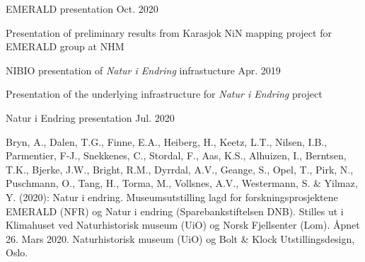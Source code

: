 
\begin{cventries}
    \cventry
  {} %
  {EMERALD presentation} %
  {} %
  {Oct. 2020} %
  {
    \begin{cvitems} %
      \item {Presentation of preliminary results from Karasjok NiN mapping project for EMERALD group at NHM}
    \end{cvitems}
  }
  \cventry
    {} %
    {NIBIO presentation of \textit{Natur i Endring} infrastucture} %
    {} %
    {Apr. 2019} %
    {
      \begin{cvitems} %
        \item {Presentation of the underlying infrastructure for \textit{Natur i Endring} project}
      \end{cvitems}
    }
  \cventry
    {} %
    {Natur i Endring presentation} %
    {} %
    {Jul. 2020} %
    {
      \begin{cvitems} %
        \item {Bryn, A., Dalen, T.G., Finne, E.A., Heiberg, H., Keetz, L.T., Nilsen, I.B., Parmentier, F-J., Snekkenes, C., Stordal, F., Aas, K.S., Alhuizen, I., Berntsen, T.K., Bjerke, J.W., Bright, R.M., Dyrrdal, A.V., Geange, S., Opel, T., Pirk, N., Puschmann, O., Tang, H., Torma, M., Vollsnes, A.V., Westermann, S. \& Yilmaz, Y. (2020): Natur i endring. Museumsutstilling lagd for forskningsprosjektene EMERALD (NFR) og Natur i endring (Sparebankstiftelsen DNB). Stilles ut i Klimahuset ved Naturhistorisk museum (UiO) og Norsk Fjellsenter (Lom). Åpnet 26. Mars 2020. Naturhistorisk museum (UiO) og Bolt \& Klock Utstillingsdesign, Oslo.}
      \end{cvitems}
    }

\end{cventries}
